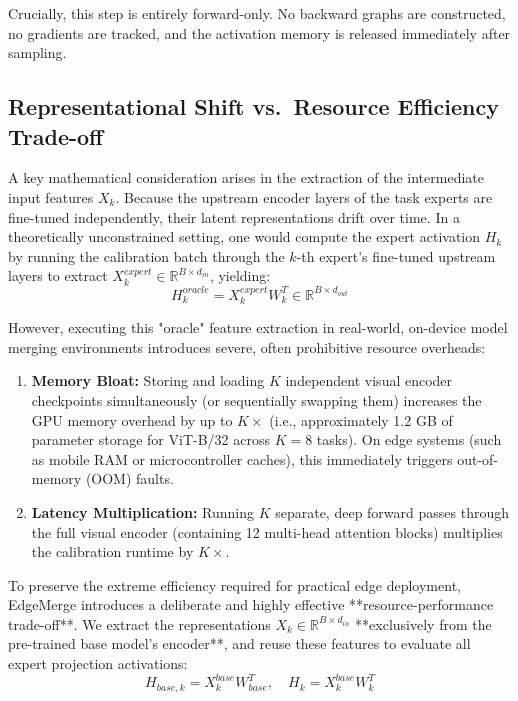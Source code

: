 Crucially, this step is entirely forward-only. No backward graphs are constructed, no gradients are tracked, and the activation memory is released immediately after sampling.

\subsection{Representational Shift vs.\ Resource Efficiency Trade-off}
\label{subsec:rep_tradeoff}
A key mathematical consideration arises in the extraction of the intermediate input features $X_k$. Because the upstream encoder layers of the task experts are fine-tuned independently, their latent representations drift over time. In a theoretically unconstrained setting, one would compute the expert activation $H_k$ by running the calibration batch through the $k$-th expert's fine-tuned upstream layers to extract $X_k^{expert} \in \mathbb{R}^{B \times d_{in}}$, yielding:
\begin{equation}
H_k^{oracle} = X_k^{expert} W_k^T \in \mathbb{R}^{B \times d_{out}}
\end{equation}

However, executing this "oracle" feature extraction in real-world, on-device model merging environments introduces severe, often prohibitive resource overheads:
\begin{enumerate}
    \item \textbf{Memory Bloat:} Storing and loading $K$ independent visual encoder checkpoints simultaneously (or sequentially swapping them) increases the GPU memory overhead by up to $K\times$ (i.e., approximately 1.2 GB of parameter storage for ViT-B/32 across $K=8$ tasks). On edge systems (such as mobile RAM or microcontroller caches), this immediately triggers out-of-memory (OOM) faults.
    \item \textbf{Latency Multiplication:} Running $K$ separate, deep forward passes through the full visual encoder (containing 12 multi-head attention blocks) multiplies the calibration runtime by $K\times$.
\end{enumerate}

To preserve the extreme efficiency required for practical edge deployment, EdgeMerge introduces a deliberate and highly effective **resource-performance trade-off**. We extract the representations $X_k \in \mathbb{R}^{B \times d_{in}}$ **exclusively from the pre-trained base model's encoder**, and reuse these features to evaluate all expert projection activations:
\begin{equation}
H_{base, k} = X_k^{base} W_{base}^T, \quad H_k = X_k^{base} W_k^T
\end{equation}

